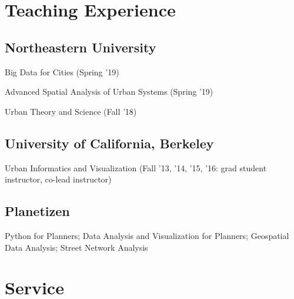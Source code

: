 \documentclass[12pt,letterpaper]{report}
\newcommand{\listitemspace}{0.15em}
\renewenvironment{itemize}
{\begin{list}{}{\setlength{\leftmargin}{0em}
			\setlength{\parskip}{0em}
			\setlength{\itemsep}{\listitemspace}
			\setlength{\parsep}{\listitemspace}}}
	{\end{list}}
\begin{document}
	
	
	\section*{Teaching Experience}
	
	\subsection*{Northeastern University}
	
	\begin{itemize}
		
		\item Big Data for Cities (Spring '19)
		
		\item Advanced Spatial Analysis of Urban Systems (Spring '19)
		
		\item Urban Theory and Science (Fall '18)
		
	\end{itemize}
	
	\subsection*{University of California, Berkeley}
	
	\begin{itemize}
		
		\item Urban Informatics and Visualization (Fall '13, '14, '15, '16: grad student instructor, co-lead instructor)
		
	\end{itemize}
	
	\subsection*{Planetizen}
	
	\begin{itemize}
		
		\item Python for Planners; Data Analysis and Visualization for Planners; Geospatial Data Analysis; Street Network Analysis
		
	\end{itemize}
	
	
	\section*{Service}
	
\end{document}
